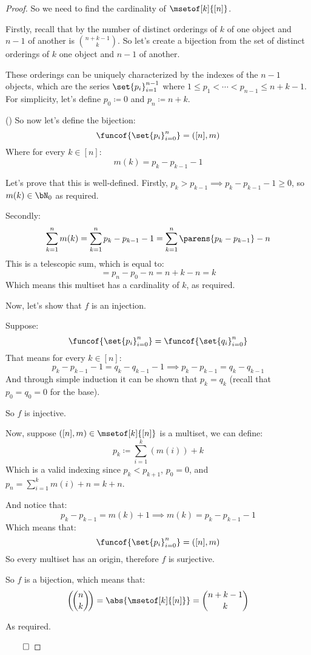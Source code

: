 \begin{proof}

	So we need to find the cardinality of $\msetof[k]{[n]}$.

	Firstly, recall that by 
	the number of distinct orderings of $k$ of one object and $n-1$ of another is $\binom{n+k-1}{k}$.
	So let's create a bijection from the set of distinct orderings of $k$ one object and $n-1$ of another.

	These orderings can be uniquely characterized by the indexes of the $n-1$ objects, which are the series
	$\set{p_i}_{i=1}^{n-1}$ where $1\leq p_1<\cdots<p_{n-1}\leq n+k-1$.
	For simplicity, let's define $p_0\coloneqq0$ and $p_n\coloneqq n+k$.

	({})
	So now let's define the bijection:
	\[ \funcof{\set{p_i}_{i=0}^n} = ([n], m) \]
	Where for every $k\in[n]$:
	\[ m(k) = p_k - p_{k-1} - 1 \]

	Let's prove that this is well-defined.
	Firstly, $p_k>p_{k-1}\implies p_k-p_{k-1}-1\geq0$, so $m(k)\in\bN_0$ as required.

	Secondly:
	\[ \sum_{k=1}^n m(k) = \sum_{k=1}^n p_k - p_{k-1} - 1 = \sum_{k=1}^n\parens{p_k-p_{k-1}} - n \]
	This is a telescopic sum, which is equal to:
	\[ = p_n - p_0 - n = n+k - n = k \]
	Which means this multiset has a cardinality of $k$, as required.

	Now, let's show that $f$ is an injection.

	Suppose:
	\[ \funcof{\set{p_i}_{i=0}^n} = \funcof{\set{q_i}_{i=0}^n} \]
	That means for every $k\in[n]$:
	\[ p_k - p_{k-1} - 1 = q_k - q_{k-1} - 1 \implies p_k - p_{k-1} = q_k - q_{k-1} \]
	And through simple induction it can be shown that $p_k=q_k$ (recall that $p_0=q_0=0$ for the base).

	So $f$ is injective.

	Now, suppose $([n], m)\in\msetof[k]{[n]}$ is a multiset, we can define:
	\[ p_k\coloneqq\sum_{i=1}^k (m(i)) + k \]
	Which is a valid indexing since $p_k<p_{k+1}$, $p_0=0$, and $p_n=\sum\limits_{i=1}^k m(i) + n = k+n$.

	And notice that:
	\[ p_k - p_{k-1} = m(k) + 1 \implies m(k) = p_k - p_{k-1} - 1 \]
	Which means that:
	\[ \funcof{\set{p_i}_{i=0}^n} = ([n], m) \]
	So every multiset has an origin, therefore $f$ is surjective.

	So $f$ is a bijection, which means that:
	\[ \msetcoeff{n}{k} = \abs{\msetof[k]{[n]}} = \binom{n+k-1}{k} \]

	As required.

\hfill$\qed$

\end{proof}

